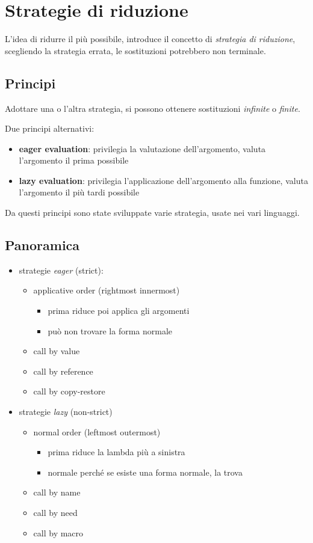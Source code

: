 \section{Strategie di riduzione}
L'idea di ridurre il più possibile, introduce il concetto di \textit{strategia di riduzione}, scegliendo la strategia errata, le sostituzioni potrebbero non terminale.

\subsection{Principi}
Adottare una o l'altra strategia, si possono ottenere sostituzioni \textit{infinite} o \textit{finite}.

Due principi alternativi:
\begin{itemize}
    \item \textbf{eager evaluation}: privilegia la valutazione dell'argomento, valuta l'argomento il prima possibile
    \item \textbf{lazy evaluation}: privilegia l'applicazione dell'argomento alla funzione, valuta l'argomento il più tardi possibile
\end{itemize}

Da questi principi sono state sviluppate varie strategia, usate nei vari linguaggi.

\subsection{Panoramica}
\begin{itemize}
    \item strategie \textit{eager} (strict):
    \begin{itemize}
        \item applicative order (rightmost innermost)
        \begin{itemize}
            \item prima riduce poi applica gli argomenti
            \item può non trovare la forma normale
        \end{itemize}
        \item call by value
        \item call by reference
        \item call by copy-restore
    \end{itemize}
    \item strategie \textit{lazy} (non-strict)
    \begin{itemize}
        \item normal order (leftmost outermost)
        \begin{itemize}
            \item prima riduce la lambda più a sinistra
            \item normale perché se esiste una forma normale, la trova
        \end{itemize}
        \item call by name
        \item call by need
        \item call by macro
    \end{itemize}
\end{itemize}


